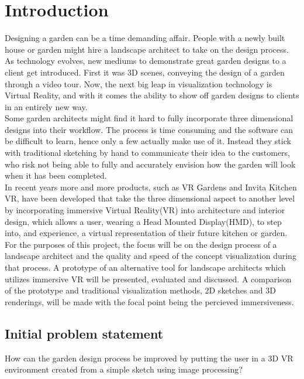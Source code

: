 \chapter{Introduction}
	Designing a garden can be a time demanding affair. People with a newly built house or garden might hire a landscape architect to take on the design process. As technology evolves, new mediums to demonstrate great garden designs to a client get introduced\cite{landscapeArchitectureDigiTech}. First it was 3D scenes, conveying the design of a garden through a video tour. Now, the next big leap in visualization technology is Virtual Reality\cite{VRS}, and with it comes the ability to show off garden designs to clients in an entirely new way.\\
	
	Some garden architects might find it hard to fully incorporate three dimensional designs into their workflow. The process is time consuming and the software can be difficult to learn, hence only a few actually make use of it. Instead they stick with traditional sketching by hand to communicate their idea to the customers, who risk not being able to fully and accurately envision how the garden will look when it has been completed.\\
	
	In recent years more and more products, such as VR Gardens and Invita Kitchen VR, have been developed that take the three dimensional aspect to another level by incorporating immersive Virtual Reality(VR) into architecture and interior design, which allows a user, wearing a Head Mounted Display(HMD), to step into, and experience, a virtual representation of their future kitchen or garden.\\
	
	For the purposes of this project, the focus will be on the design process of a landscape architect and the quality and speed of the concept visualization during that process. A prototype of an alternative tool for landscape architects which utilizes immersive VR will be presented, evaluated and discussed. A comparison of the prototype and traditional visualization methods, 2D sketches and 3D renderings, will be made with the focal point being the percieved immersiveness.
	
	
	\section{Initial problem statement}
	How can the garden design process be improved by putting the user in a 3D VR environment created from a simple sketch using image processing?
	